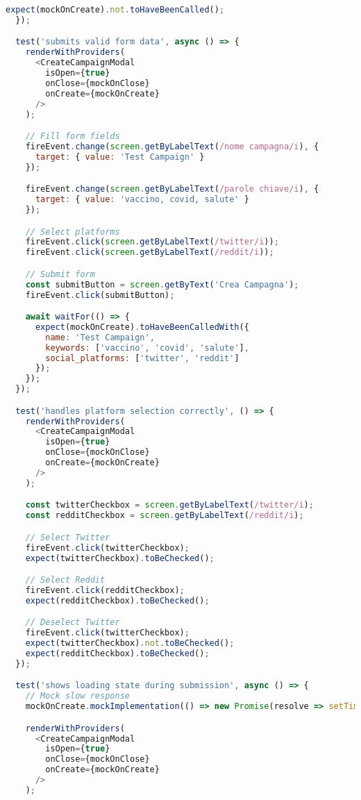 \documentclass[12pt,a4paper]{report}
\begin{document}
\begin{lstlisting}[language=javascript, caption=Example React Component Tests]
    expect(mockOnCreate).not.toHaveBeenCalled();
  });

  test('submits valid form data', async () => {
    renderWithProviders(
      <CreateCampaignModal 
        isOpen={true} 
        onClose={mockOnClose} 
        onCreate={mockOnCreate} 
      />
    );

    // Fill form fields
    fireEvent.change(screen.getByLabelText(/nome campagna/i), {
      target: { value: 'Test Campaign' }
    });

    fireEvent.change(screen.getByLabelText(/parole chiave/i), {
      target: { value: 'vaccino, covid, salute' }
    });

    // Select platforms
    fireEvent.click(screen.getByLabelText(/twitter/i));
    fireEvent.click(screen.getByLabelText(/reddit/i));

    // Submit form
    const submitButton = screen.getByText('Crea Campagna');
    fireEvent.click(submitButton);

    await waitFor(() => {
      expect(mockOnCreate).toHaveBeenCalledWith({
        name: 'Test Campaign',
        keywords: ['vaccino', 'covid', 'salute'],
        social_platforms: ['twitter', 'reddit']
      });
    });
  });

  test('handles platform selection correctly', () => {
    renderWithProviders(
      <CreateCampaignModal 
        isOpen={true} 
        onClose={mockOnClose} 
        onCreate={mockOnCreate} 
      />
    );

    const twitterCheckbox = screen.getByLabelText(/twitter/i);
    const redditCheckbox = screen.getByLabelText(/reddit/i);

    // Select Twitter
    fireEvent.click(twitterCheckbox);
    expect(twitterCheckbox).toBeChecked();

    // Select Reddit
    fireEvent.click(redditCheckbox);
    expect(redditCheckbox).toBeChecked();

    // Deselect Twitter
    fireEvent.click(twitterCheckbox);
    expect(twitterCheckbox).not.toBeChecked();
    expect(redditCheckbox).toBeChecked();
  });

  test('shows loading state during submission', async () => {
    // Mock slow response
    mockOnCreate.mockImplementation(() => new Promise(resolve => setTimeout(resolve, 1000)));

    renderWithProviders(
      <CreateCampaignModal 
        isOpen={true} 
        onClose={mockOnClose} 
        onCreate={mockOnCreate} 
      />
    );


\end{lstlisting}
\end{document}
